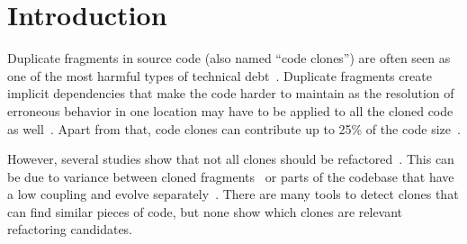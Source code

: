 \documentclass[sigconf,review,anonymous]{acmart}
\begin{document}

\maketitle

\section{Introduction}
Duplicate fragments in source code (also named ``code clones'') are often seen as one of the most harmful types of technical debt~\cite{fowler2018refactoring}. Duplicate fragments create implicit dependencies that make the code harder to maintain as the resolution of erroneous behavior in one location may have to be applied to all the cloned code as well~\cite{ostberg2014automatically, chatterji2013effects}. Apart from that, code clones can contribute up to 25\% of the code size~\cite{bruntink2005use}.

However, several studies show that not all clones should be refactored~\cite{jarzabek2010clones, kapser2008cloning}. This can be due to variance between cloned fragments~\cite{roy2007survey} or parts of the codebase that have a low coupling and evolve separately~\cite{jarzabek2010clones}. There are many tools to detect clones \cite{roy2007survey, sheneamer2016survey, svajlenko2014evaluating, gautam2016various} that can find similar pieces of code, but none show which clones are relevant refactoring candidates.
\end{document}
